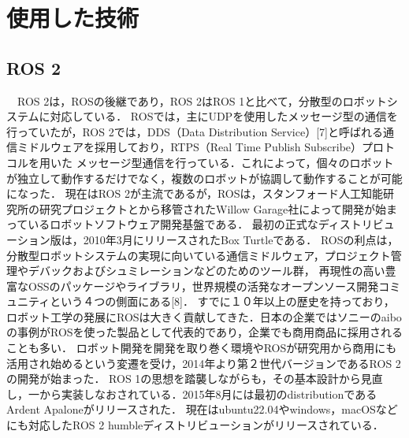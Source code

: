\chapter{使用した技術}
\label{sec:usage}
\section{ROS 2}
　ROS 2は，ROSの後継であり，ROS 2はROS 1と比べて，分散型のロボットシステムに対応している．
ROSでは，主にUDPを使用したメッセージ型の通信を行っていたが，ROS 2では，DDS（Data Distribution Service）[7]と呼ばれる通信ミドルウェアを採用しており，RTPS（Real Time Publish Subscribe）プロトコルを用いた
メッセージ型通信を行っている．これによって，個々のロボットが独立して動作するだけでなく，複数のロボットが協調して動作することが可能になった．
現在はROS 2が主流であるが，ROSは，スタンフォード人工知能研究所の研究プロジェクトとから移管されたWillow Garage社によって開発が始まっているロボットソフトウェア開発基盤である．
最初の正式なディストリビューション版は，2010年3月にリリースされたBox Turtleである．
ROSの利点は，分散型ロボットシステムの実現に向いている通信ミドルウェア，プロジェクト管理やデバックおよびシュミレーションなどのためのツール群，
再現性の高い豊富なOSSのパッケージやライブラリ，世界規模の活発なオープンソース開発コミュニティという４つの側面にある[8]．
すでに１０年以上の歴史を持っており，ロボット工学の発展にROSは大きく貢献してきた．日本の企業ではソニーのaiboの事例がROSを使った製品として代表的であり，企業でも商用商品に採用されることも多い．
ロボット開発を開発を取り巻く環境やROSが研究用から商用にも活用され始めるという変遷を受け，2014年より第２世代バージョンであるROS 2の開発が始まった．
ROS 1の思想を踏襲しながらも，その基本設計から見直し，一から実装しなおされている．2015年8月には最初のdistributionであるArdent Apaloneがリリースされた．
現在はubuntu22.04やwindows，macOSなどにも対応したROS 2 humbleディストリビューションがリリースされている．

